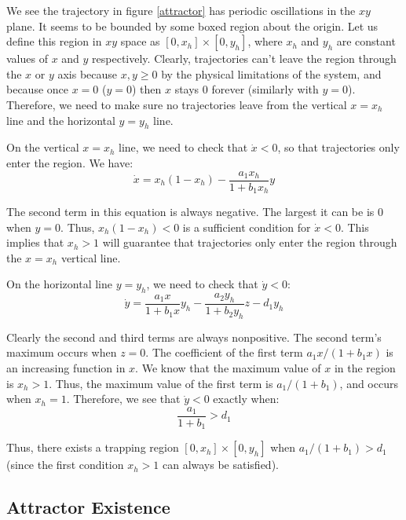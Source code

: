 \documentclass{article}
\begin{document}
We see the trajectory in figure \ref{attractor} has periodic oscillations in the $xy$ plane. It seems to be bounded by some boxed region about the origin. Let us define this region in $xy$ space as $[0,x_h] \times [0, y_h]$, where $x_h$ and $y_h$ are constant values of $x$ and $y$ respectively. Clearly, trajectories can't leave the region through the $x$ or $y$ axis because $x,y \geq 0$ by the physical limitations of the system, and because once $x=0$ ($y = 0$) then $x$ stays 0 forever (similarly with $y = 0$). Therefore, we need to make sure no trajectories leave from the vertical $x = x_h$ line and the horizontal $y = y_h$ line. 

On the vertical $x = x_h$ line, we need to check that $\dot{x} < 0$, so that trajectories only enter the region. We have:
\begin{equation}
\dot{x} = x_h(1 - x_h) - \frac{a_1 x_h}{1 + b_1 x_h} y
\end{equation}

The second term in this equation is always negative. The largest it can be is $0$ when $y = 0$. Thus, $x_h ( 1 - x_h) < 0$ is a sufficient condition for $\dot{x} < 0$. This implies that $x_h > 1$ will guarantee that trajectories only enter the region through the $x = x_h$ vertical line. 

On the horizontal line $y = y_h$, we need to check that $\dot{y} < 0$:
\begin{equation}
\dot{y} = \frac{a_1 x}{1 + b_1 x} y_h - \frac{a_2 y_h}{1 + b_2 y_h} z - d_1 y_h
\end{equation}

Clearly the second and third terms are always nonpositive. The second term's maximum occurs when $z = 0$. The coefficient of the first term $a_1 x / (1 + b_1 x)$ is an increasing function in $x$. We know that the maximum value of $x$ in the region is $x_h > 1$. Thus, the maximum value of the first term is $a_1 / (1 + b_1)$, and occurs when $x_h = 1$. Therefore, we see that $\dot{y} < 0$ exactly when:
\begin{equation}
\frac{a_1}{1 + b_1} > d_1
\end{equation}

Thus, there exists a trapping region $[0,x_h] \times [0, y_h]$ when $a_1 / (1 + b_1) > d_1$ (since the first condition $x_h > 1$ can always be satisfied). 

\subsection{Attractor Existence}
\label{sec:attractorexist}
\end{document}
